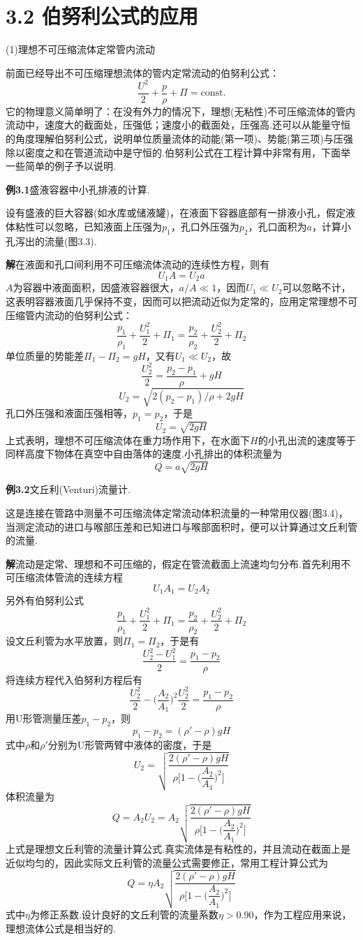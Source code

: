 \section*{3.2  伯努利公式的应用}

(1)理想不可压缩流体定常管内流动

前面已经导出不可压缩理想流体的管内定常流动的伯努利公式：
\[
\frac{U^{2}}{2}+\frac{p}{\rho}+\Pi=\mathrm{const.}
\]
它的物理意义简单明了：在没有外力的情况下，理想(无粘性)不可压缩流体的管内流动中，速度大的截面处，压强低；速度小的截面处，压强高.还可以从能量守恒的角度理解伯努利公式，说明单位质量流体的动能(第一项)、势能(第三项)与压强除以密度之和在管道流动中是守恒的.伯努利公式在工程计算中非常有用，下面举一些简单的例子予以说明.

\noindent\textbf{例3.1}\quad 盛液容器中小孔排液的计算.

设有盛液的巨大容器(如水库或储液罐)，在液面下容器底部有一排液小孔，假定液体粘性可以忽略，已知液面上压强为$p_1$，孔口外压强为$p_2$，孔口面积为$a$，计算小孔泻出的流量(图3.3).

\noindent\textbf{解}\quad 在液面和孔口间利用不可压缩流体流动的连续性方程，则有
\[
U_1 A=U_2 a
\]
$A$为容器中液面面积，因盛液容器很大，$a/A\ll 1$，因而$U_1\ll U_2$可以忽略不计，这表明容器液面几乎保持不变，因而可以把流动近似为定常的，应用定常理想不可压缩管内流动的伯努利公式：
\[
\frac{p_1}{\rho_1}+\frac{U_1^{2}}{2}+\Pi_1=\frac{p_2}{\rho_2}+\frac{U_2^{2}}{2}+\Pi_2
\]
单位质量的势能差$\Pi_1-\Pi_2=gH$，又有$U_1\ll U_2$，故
\[
\frac{U_2^{2}}{2}=\frac{p_2-p_1}{\rho}+gH
\]
\[
U_2=\sqrt{2(p_2-p_1)/\rho+2gH}
\]
孔口外压强和液面压强相等，$p_1=p_2$，于是
\[
U_2=\sqrt{2gH}
\]
上式表明，理想不可压缩流体在重力场作用下，在水面下$H$的小孔出流的速度等于同样高度下物体在真空中自由落体的速度.小孔排出的体积流量为
\[
Q=a\sqrt{2gH}
\]

\noindent\textbf{例3.2}\quad 文丘利(Venturi)流量计.

这是连接在管路中测量不可压缩流体定常流动体积流量的一种常用仪器(图3.4)，当测定流动的进口与喉部压差和已知进口与喉部面积时，便可以计算通过文丘利管的流量.

\noindent\textbf{解}\quad 流动是定常、理想和不可压缩的，假定在管流截面上流速均匀分布.首先利用不可压缩流体管流的连续方程
\[
U_1 A_1=U_2 A_2
\]
另外有伯努利公式
\[
\frac{p_1}{\rho_1}+\frac{U_1^{2}}{2}+\Pi_1=\frac{p_2}{\rho_2}+\frac{U_2^{2}}{2}+\Pi_2
\]
设文丘利管为水平放置，则$\Pi_1=\Pi_2$，于是有
\[
\frac{U_2^{2}-U_1^{2}}{2}=\frac{p_1-p_2}{\rho}
\]
将连续方程代入伯努利方程后有
\[
\frac{U_2^{2}}{2}-\Big(\frac{A_2}{A_1}\Big)^{2}\frac{U_2^{2}}{2}=\frac{p_1-p_2}{\rho}
\]
用U形管测量压差$p_1-p_2$，则
\[
p_1-p_2=(\rho'-\rho)gH
\]
式中$\rho$和$\rho'$分别为U形管两臂中液体的密度，于是
\[
U_2=\sqrt{\frac{2(\rho'-\rho)gH}{\rho\Big[1-\Big(\dfrac{A_2}{A_1}\Big)^{2}\Big]}}
\]
体积流量为
\[
Q=A_2U_2=A_2\sqrt{\frac{2(\rho'-\rho)gH}{\rho\Big[1-\Big(\dfrac{A_2}{A_1}\Big)^{2}\Big]}}
\]
上式是理想文丘利管的流量计算公式.真实流体是有粘性的，并且流动在截面上是近似均匀的，因此实际文丘利管的流量公式需要修正，常用工程计算公式为
\[
Q=\eta A_2\sqrt{\frac{2(\rho'-\rho)gH}{\rho\Big[1-\Big(\dfrac{A_2}{A_1}\Big)^{2}\Big]}}
\]
式中$\eta$为修正系数.设计良好的文丘利管的流量系数$\eta>0.90$，作为工程应用来说，理想流体公式是相当好的.

